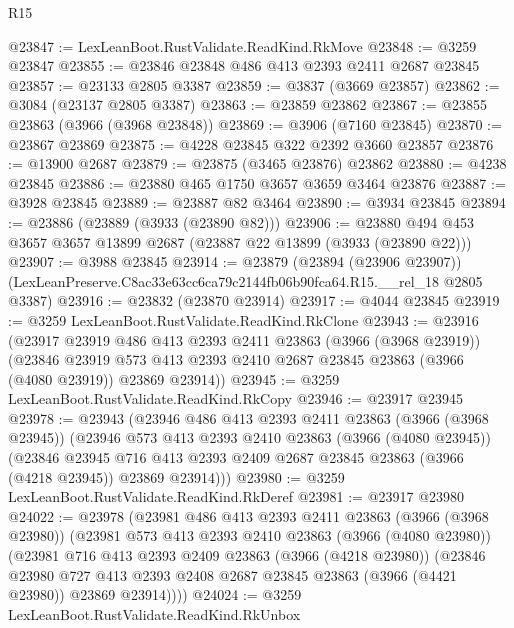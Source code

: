 \begin{lexlean}{R15}
\begin{coremodule}
@23847 := LexLeanBoot.RustValidate.ReadKind.RkMove
@23848 := @3259 @23847
@23855 := @23846 @23848 @486 @413 @2393 @2411 @2687 @23845
@23857 := @23133 @2805 @3387
@23859 := @3837 (@3669 @23857)
@23862 := @3084 (@23137 @2805 @3387)
@23863 := @23859 @23862
@23867 := @23855 @23863 (@3966 (@3968 @23848))
@23869 := @3906 (@7160 @23845)
@23870 := @23867 @23869
@23875 := @4228 @23845 @322 @2392 @3660 @23857
@23876 := @13900 @2687
@23879 := @23875 (@3465 @23876) @23862
@23880 := @4238 @23845
@23886 := @23880 @465 @1750 @3657 @3659 @3464 @23876
@23887 := @3928 @23845
@23889 := @23887 @82 @3464
@23890 := @3934 @23845
@23894 := @23886 (@23889 (@3933 (@23890 @82)))
@23906 := @23880 @494 @453 @3657 @3657 @13899 @2687 (@23887 @22 @13899 (@3933 (@23890 @22)))
@23907 := @3988 @23845
@23914 := @23879
    (@23894 (@23906 @23907))
    (LexLeanPreserve.C8ac33e63cc6ca79c2144fb06b90fca64.R15.__rel_18 @2805 @3387)
@23916 := @23832 (@23870 @23914)
@23917 := @4044 @23845
@23919 := @3259 LexLeanBoot.RustValidate.ReadKind.RkClone
@23943 := @23916
    (@23917
      @23919
      @486
      @413
      @2393
      @2411
      @23863
      (@3966 (@3968 @23919))
      (@23846
        @23919
        @573
        @413
        @2393
        @2410
        @2687
        @23845
        @23863
        (@3966 (@4080 @23919))
        @23869
        @23914))
@23945 := @3259 LexLeanBoot.RustValidate.ReadKind.RkCopy
@23946 := @23917 @23945
@23978 := @23943
    (@23946
      @486
      @413
      @2393
      @2411
      @23863
      (@3966 (@3968 @23945))
      (@23946
        @573
        @413
        @2393
        @2410
        @23863
        (@3966 (@4080 @23945))
        (@23846
          @23945
          @716
          @413
          @2393
          @2409
          @2687
          @23845
          @23863
          (@3966 (@4218 @23945))
          @23869
          @23914)))
@23980 := @3259 LexLeanBoot.RustValidate.ReadKind.RkDeref
@23981 := @23917 @23980
@24022 := @23978
    (@23981
      @486
      @413
      @2393
      @2411
      @23863
      (@3966 (@3968 @23980))
      (@23981
        @573
        @413
        @2393
        @2410
        @23863
        (@3966 (@4080 @23980))
        (@23981
          @716
          @413
          @2393
          @2409
          @23863
          (@3966 (@4218 @23980))
          (@23846
            @23980
            @727
            @413
            @2393
            @2408
            @2687
            @23845
            @23863
            (@3966 (@4421 @23980))
            @23869
            @23914))))
@24024 := @3259 LexLeanBoot.RustValidate.ReadKind.RkUnbox

\end{coremodule}
\end{lexlean}
